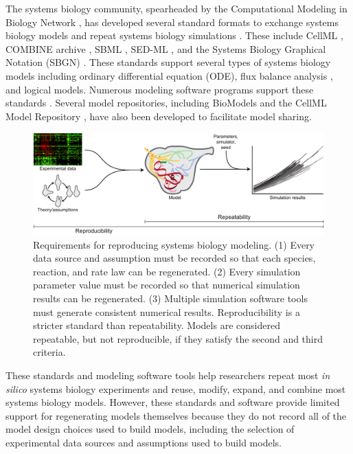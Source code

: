 \documentclass[journal,transmag,twoside]{IEEEtran}
\begin{document}
The systems biology community, spearheaded by the Computational Modeling in Biology Network \cite{hucka2015promoting}, has developed several standard formats to exchange systems biology models and repeat systems biology simulations \cite{drager2014improving}. These include CellML \cite{cuellar2003overview}, COMBINE archive \cite{COMBINE2012}, SBML \cite{hucka2003}, SED-ML \cite{sedml2011}, and the Systems Biology Graphical Notation (SBGN) \cite{LeNovereHMMSS09}. These standards support several types of systems biology models including ordinary differential equation (ODE), flux balance analysis \cite{orth2010flux}, and logical models. Numerous modeling software programs support these standards \cite{hucka2011profile}. Several model repositories,  including BioModels \cite{chelliah2015biomodels} and the CellML Model Repository \cite{lloyd2008cellml}, have also been developed to facilitate model sharing. 

\begin{figure}[!tb]
\centering
\includegraphics[width=\textwidth]{figure1/figure1}
\caption{Requirements for reproducing systems biology modeling. (1) Every data source and assumption must be recorded so that each species, reaction, and rate law can be regenerated. (2) Every simulation parameter value must be recorded so that numerical simulation results can be regenerated. (3) Multiple simulation software tools must generate consistent numerical results. Reproducibility is a stricter standard than repeatability. Models are considered repeatable, but not reproducible, if they satisfy the second and third criteria.}
\label{fig_repro_diagram}
\end{figure}

These standards and modeling software tools help researchers repeat most \textit{in silico} systems biology experiments and reuse, modify, expand, and combine most systems biology models. However, these standards and software provide limited support for regenerating models themselves because they do not record all of the model design choices used to build models, including the selection of experimental data sources and assumptions used to build models.
\end{document}
